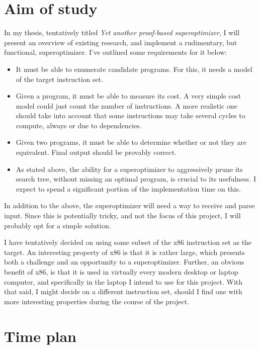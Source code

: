 \documentclass[a4paper,11pt]{kth-mag}
\begin{document}
\section*{Aim of study}

In my thesis, tentatively titled \emph{Yet another proof-based superoptimizer},
I will present an overview of existing research, and implement a rudimentary, but functional, superoptimizer.
I've outlined some requirements for it below:

\begin{itemize}
\item It must be able to enumerate candidate programs. For this, it needs a model of the target instruction set.
\item Given a program, it must be able to measure its cost. A very simple cost model could just count the number of instructions. A more realistic one should take into account that some instructions may take several cycles to compute, always or due to dependencies.
\item Given two programs, it must be able to determine whether or not they are equivalent. Final output should be provably correct.
\item As stated above, the ability for a superoptimizer to aggressively prune its search tree, without missing an optimal program, is crucial to its usefulness. I expect to spend a significant portion of the implementation time on this.
\end{itemize}

In addition to the above, the superoptimizer will need a way to receive and parse input.
Since this is potentially tricky, and not the focus of this project, I will probably opt for a simple solution.

I have tentatively decided on using some subset of the x86 instruction set as the target.
An interesting property of x86 is that it is rather large, which presents both a challenge and an opportunity to a superoptimizer.
Further, an obvious benefit of x86, is that it is used in virtually every modern desktop or laptop computer, and specifically in the laptop I intend to use for this project.
With that said, I might decide on a different instruction set, should I find one with more interesting properties during the course of the project.

\section*{Time plan}
\end{document}
